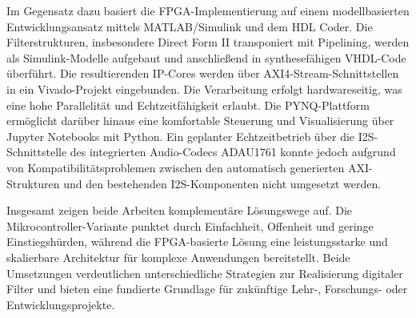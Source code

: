 \documentclass[
  ngerman,
  letterpaper,
  DIV=11]{scrreprt}
\begin{document}
Im Gegensatz dazu basiert die FPGA-Implementierung auf einem
modellbasierten Entwicklungsansatz mittels MATLAB/Simulink und dem HDL
Coder. Die Filterstrukturen, insbesondere Direct Form II transponiert
mit Pipelining, werden als Simulink-Modelle aufgebaut und anschließend
in synthesefähigen VHDL-Code überführt. Die resultierenden IP-Cores
werden über AXI4-Stream-Schnittstellen in ein Vivado-Projekt
eingebunden. Die Verarbeitung erfolgt hardwareseitig, was eine hohe
Parallelität und Echtzeitfähigkeit erlaubt. Die PYNQ-Plattform
ermöglicht darüber hinaus eine komfortable Steuerung und Visualisierung
über Jupyter Notebooks mit Python. Ein geplanter Echtzeitbetrieb über
die I2S-Schnittstelle des integrierten Audio-Codecs ADAU1761 konnte
jedoch aufgrund von Kompatibilitätsproblemen zwischen den automatisch
generierten AXI-Strukturen und den bestehenden I2S-Komponenten nicht
umgesetzt werden.

Insgesamt zeigen beide Arbeiten komplementäre Lösungswege auf. Die
Mikrocontroller-Variante punktet durch Einfachheit, Offenheit und
geringe Einstiegshürden, während die FPGA-basierte Lösung eine
leistungsstarke und skalierbare Architektur für komplexe Anwendungen
bereitstellt. Beide Umsetzungen verdeutlichen unterschiedliche
Strategien zur Realisierung digitaler Filter und bieten eine fundierte
Grundlage für zukünftige Lehr-, Forschungs- oder Entwicklungsprojekte.
\end{document}
